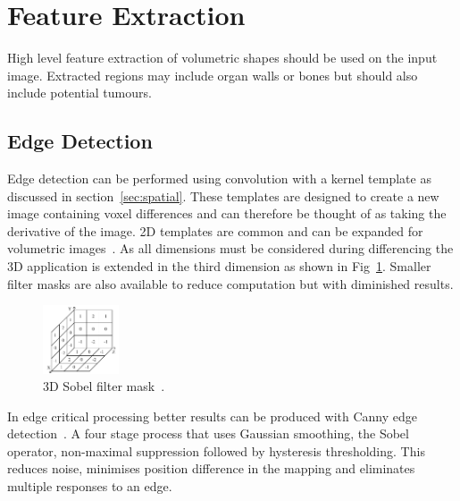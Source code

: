 \documentclass[journal]{IEEEtran}
\begin{document}
\section{Feature Extraction}
\label{sec:extraction}

High level feature extraction of volumetric shapes should be used on the input image.
Extracted regions may include organ walls or bones but should also include potential tumours.


\subsection{Edge Detection}
\label{sec:edge}
Edge detection can be performed using convolution with a kernel template as discussed in section~\ref{sec:spatial}. 
These templates are designed to create a new image containing voxel differences and can therefore be thought of as taking the derivative of the image.
2D templates are common and can be expanded for volumetric images~\cite{nixon02feature}.
As all dimensions must be considered during differencing the 3D application is extended in the third dimension as shown in Fig~\ref{fig:sobel}.
Smaller filter masks are also available to reduce computation but with diminished results.

\begin{figure}[!htb]
   \centering
   \includegraphics[width = 0.2\textwidth]{Figures/Sobel.pdf}
   \caption{3D Sobel filter mask~\cite{lohmann1998volumetric}.}
   \label{fig:sobel}
\end{figure}

In edge critical processing better results can be produced with Canny edge detection~\cite{canny86edge}. 
A four stage process that uses Gaussian smoothing, the Sobel operator, non-maximal suppression followed by hysteresis thresholding.
This reduces noise, minimises position difference in the mapping and eliminates multiple responses to an edge.
\end{document}
